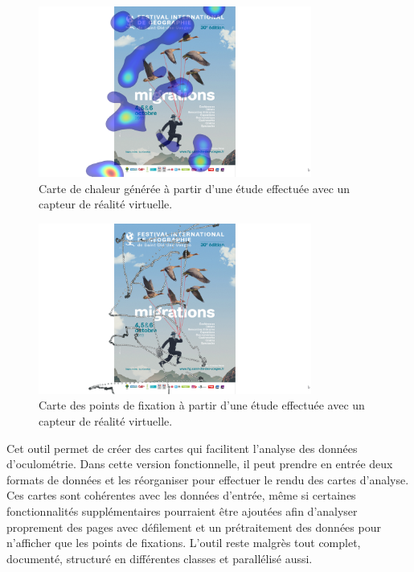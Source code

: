 \documentclass[hidelinks,12pt]{article}
\begin{document}
\begin{figure}[htpb]
  \centering
  \includegraphics[width=0.8\textwidth,keepaspectratio=true]{vr-heatmap-0.png}
  \caption{Carte de chaleur générée à partir d'une étude effectuée avec un
    capteur de réalité virtuelle.}
  \label{fig:vr-resultats-heatmap}
\end{figure}

\begin{figure}[htpb]
  \centering
  \includegraphics[width=0.8\textwidth,keepaspectratio=true]{vr-raw-0.png}
  \caption{Carte des points de fixation à partir d'une étude effectuée avec un
    capteur de réalité virtuelle.}
  \label{fig:vr-resultats-raw}
\end{figure}

\bigskip
Cet outil permet de créer des cartes qui facilitent l'analyse des données
d'oculométrie. Dans cette version fonctionnelle, il peut prendre en entrée deux
formats de données et les réorganiser pour effectuer le rendu des cartes
d'analyse. Ces cartes sont cohérentes avec les données d'entrée, même si
certaines fonctionnalités supplémentaires pourraient être ajoutées afin
d'analyser proprement des pages avec défilement et un prétraitement des données
pour n'afficher que les points de fixations. L'outil reste malgrès tout complet,
documenté, structuré en différentes classes et parallélisé aussi.
\end{document}
